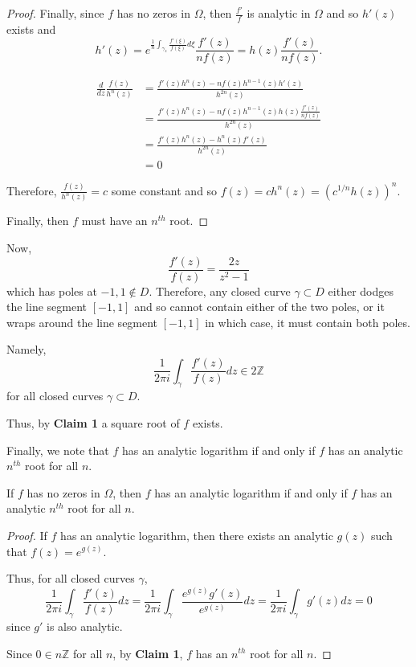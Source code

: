 \documentclass[12pt]{Homework}
\begin{document}
\begin{solution}
\begin{claim}
\begin{proof}
Finally, since $f$ has no zeros in $\Omega$, then $\frac{f'}{f}$ is analytic in $\Omega$ and so $h'(z)$ exists and $$h'(z)=e^{\frac{1}{n}\int_{\gamma_z}\frac{f'(\xi)}{f(\xi)}d\xi}\frac{f'(z)}{nf(z)}=h(z)\frac{f'(z)}{nf(z)}.$$

\begin{align*}
    \frac{d}{dz}\frac{f(z)}{h^n(z)}&=\frac{f'(z)h^n(z)-nf(z)h^{n-1}(z)h'(z)}{h^{2n}(z)}\\
    &=\frac{f'(z)h^n(z)-nf(z)h^{n-1}(z)h(z)\frac{f'(z)}{nf(z)}}{h^{2n}(z)}\\
    &=\frac{f'(z)h^n(z)-h^n(z)f'(z)}{h^{2n}(z)}\\
    &=0
\end{align*}

Therefore, $\frac{f(z)}{h^n(z)}=c$ some constant and so $f(z)=ch^n(z)=(c^{1/n}h(z))^n$. 

Finally, then $f$ must have an $n^{th}$ root.
\end{proof}
\end{claim}

Now, $$\frac{f'(z)}{f(z)}=\frac{2z}{z^2-1}$$ which has poles at $-1,1\notin D$. Therefore, any closed curve $\gamma\subset D$ either dodges the line segment $[-1,1]$ and so cannot contain either of the two poles, or it wraps around the line segment $[-1,1]$ in which case, it must contain both poles.

Namely, $$\frac{1}{2\pi i}\int_\gamma\frac{f'(z)}{f(z)}dz\in2\mathbb{Z}$$ for all closed curves $\gamma\subset D$.

Thus, by \textbf{Claim 1} a square root of $f$ exists.

Finally, we note that $f$ has an analytic logarithm if and only if $f$ has an analytic $n^{th}$ root for all $n$.

\begin{claim} If $f$ has no zeros in $\Omega$, then $f$ has an analytic logarithm if and only if $f$ has an analytic $n^{th}$ root for all $n$.
\begin{proof} \boxed{\implies} If $f$ has an analytic logarithm, then there exists an analytic $g(z)$ such that $f(z)=e^{g(z)}.$

Thus, for all closed curves $\gamma$, $$\frac{1}{2\pi i}\int_\gamma\frac{f'(z)}{f(z)}dz=\frac{1}{2\pi i}\int_\gamma\frac{e^{g(z)}g'(z)}{e^{g(z)}}dz=\frac{1}{2\pi i}\int_\gamma g'(z)dz=0$$ since $g'$ is also analytic.

Since $0\in n\mathbb{Z}$ for all $n$, by \textbf{Claim 1}, $f$ has an $n^{th}$ root for all $n$.


\end{proof}
\end{claim}
\end{solution}
\end{document}
